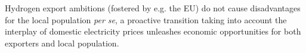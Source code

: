 Hydrogen export ambitions (fostered by e.g. the EU) do not cause disadvantages for the local population \textit{per se}, a proactive transition taking into account the interplay of domestic electricity prices unleashes economic opportunities for both exporters and local population.









